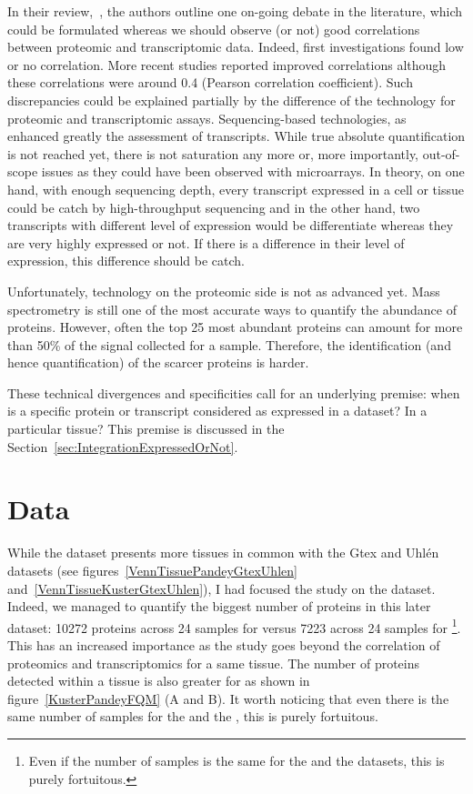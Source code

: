 In their review,~\cite{Uhlen:2016}, the authors outline one on-going debate
in the literature, which could be formulated whereas we should observe (or not) good
correlations between proteomic and transcriptomic data.
Indeed, first investigations found low or no correlation. More recent
studies reported improved correlations although these correlations were around
0.4 (Pearson correlation coefficient). Such discrepancies could be explained
partially by the difference of the technology for proteomic and transcriptomic
assays. Sequencing-based technologies, as \Rnaseq\, enhanced greatly the assessment
of transcripts. While true absolute quantification is not reached yet, there is
not saturation any more or, more importantly, out-of-scope issues as they could
have been observed with microarrays. In theory, on one hand, with enough
sequencing depth, every transcript expressed in a cell or tissue could be catch
by high-throughput sequencing and in the other hand, two transcripts with different
level of expression would be differentiate whereas they are very highly expressed
or not. If there is a difference in their level of expression, this difference
should be catch.

Unfortunately, technology on the proteomic side is not as advanced yet.
Mass spectrometry is still one of the most accurate ways to quantify the abundance
of proteins. However, often the top 25 most abundant proteins can amount for more
than 50\% of the signal collected for a sample. Therefore, the identification (and
hence quantification) of the scarcer proteins is harder.


These technical divergences and specificities call for an underlying premise:
when is a specific protein or transcript considered as
expressed in a dataset? In a particular tissue? This premise is discussed
in the Section~\ref{sec:IntegrationExpressedOrNot}.



\section{Data}
\label{sec:IntegrationData}
While the  dataset presents more tissues in common
with the Gtex and Uhlén datasets (see figures~\ref{VennTissuePandeyGtexUhlen}
and~\ref{VennTissueKusterGtexUhlen}), I had focused the study on
the  dataset. Indeed, we managed to quantify the biggest number
of proteins in this later dataset: 10272 proteins across 24 samples for
 versus 7223 across 24 samples for \footnote{Even
if the number of samples is the same for the  and
the  datasets, this is purely fortuitous.}.
This has an increased importance as the study goes beyond the correlation of
proteomics and transcriptomics for a same tissue. The number of proteins
detected within a tissue is also greater for  as shown
in figure~\ref{KusterPandeyFQM} (A and B).
It worth noticing that even there is the same number of samples for the
 and the , this is purely fortuitous.


